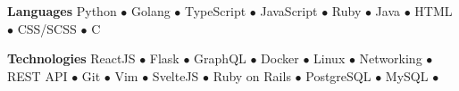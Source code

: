 \textbf{Languages} Python $\bullet$  Golang $\bullet$ TypeScript $\bullet$ JavaScript $\bullet$ Ruby $\bullet$ Java $\bullet$ HTML $\bullet$ CSS\slash SCSS $\bullet$ C

\vspace{0.2cm}

\textbf{Technologies} ReactJS $\bullet$ Flask  $\bullet$ GraphQL $\bullet$ Docker $\bullet$ Linux $\bullet$ Networking $\bullet$ REST API $\bullet$ Git $\bullet$ Vim $\bullet$ SvelteJS $\bullet$ Ruby on Rails $\bullet$ PostgreSQL $\bullet$ MySQL $\bullet$
